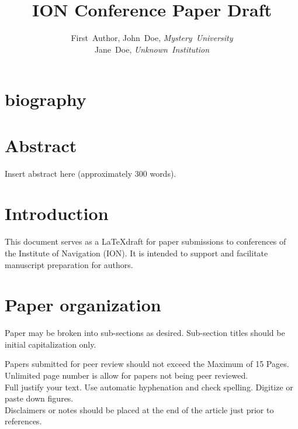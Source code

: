 \documentclass[letterpaper,times]{IONconf}
\title{ION Conference Paper Draft}
\author{
    First~Author, John~Doe, \textit{Mystery~University}%
    \vspace{1mm} \\%
    Jane~Doe, \textit{Unknown~Institution}%
    }
\begin{document}
\maketitle

\section*{biography}






\section*{Abstract}

Insert abstract here (approximately 300 words).


\section{Introduction}

This document serves as a \LaTeX  draft for paper submissions to conferences of the Institute of Navigation (ION). It is intended to support and facilitate manuscript preparation for authors.


\section{Paper organization}

Paper may be broken into sub-sections as desired. Sub-section titles should be initial capitalization only.

Papers submitted for peer review should not exceed the Maximum of 15 Pages. Unlimited page number is allow for papers not being peer reviewed.\\
Full justify your text. Use automatic hyphenation and check spelling. Digitize or paste down figures.\\
Disclaimers or notes should be placed at the end of the article just prior to references.
\end{document}
